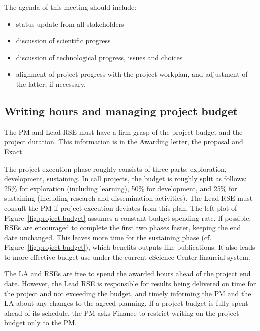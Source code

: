 The agenda of this meeting should include:
\begin{itemize}
\item status update from all stakeholders
\item discussion of scientific progress
\item discussion of technological progress, issues and choices
\item alignment of project progress with the project workplan, and adjustment of the latter, if necessary.
\end{itemize}

\subsection{Writing hours and managing project budget}
\label{sec:exec:budget}
The PM and Lead RSE must have a firm grasp of the project budget and the project duration. This information is in the
Awarding letter, the proposal and Exact.

The project execution phase roughly consists of three parts: exploration, development, sustaining.
In call projects, the budget is roughly split as follows: 25\% for 
exploration (including learning), 50\% for development, and 25\% for sustaining (including research
and dissemination activities). The Lead RSE must consult the PM if project execution deviates from this plan. 
%
The left plot of Figure~\ref{fig:project-budget} assumes a constant budget spending rate. If possible, RSEs are encouraged to complete the first two phases faster, 
keeping the end date unchanged. This leaves more time for the sustaining phase (cf. Figure~\ref{fig:project-budget}), which benefits outputs like publications. 
It also leads to more effective budget use under the current eScience Center financial system.


The LA and RSEs are free to spend the awarded hours ahead of the project end date. However, the Lead RSE is responsible 
for results being delivered on time for the project and not exceeding the budget, and timely informing the PM and the LA 
about any changes to the agreed planning. If a project budget is fully spent ahead of its schedule, the PM asks Finance to restrict writing on the
project budget only to the PM.

